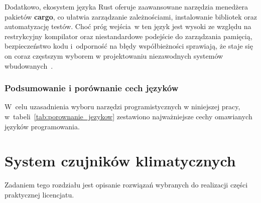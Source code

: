 Dodatkowo, ekosystem języka Rust oferuje zaawansowane narzędzia menedżera 
pakietów \textbf{cargo}, co ułatwia zarządzanie zależnościami, instalowanie
bibliotek oraz automatyzację testów. 
Choć próg wejścia~w ten język jest wysoki ze 
względu na restrykcyjny kompilator oraz niestandardowe podejście do 
zarządzania pamięcią, bezpieczeństwo kodu i~odporność 
na błędy współbieżności  sprawiają, 
że staje się on coraz częstszym wyborem w projektowaniu 
niezawodnych systemów wbudowanych~\cite{TheRustProgrammingLanguage}.

\subsection{Podsumowanie i porównanie cech języków}
\label{section:lang_compare}
W~celu uzasadnienia wyboru narzędzi programistycznych w niniejszej pracy, 
w~tabeli~\ref{tab:porownanie_jezykow} zestawiono najważniejsze cechy
omawianych języków programowania.

\begin{table}[h!]
\centering
\caption{Porównanie języków programowania w systemach wbudowanych}
\label{tab:porownanie_jezykow}
\end{table}

\chapter{System czujników klimatycznych}
Zadaniem tego rozdziału jest opisanie rozwiązań wybranych do realizacji
części praktycznej licencjatu.

